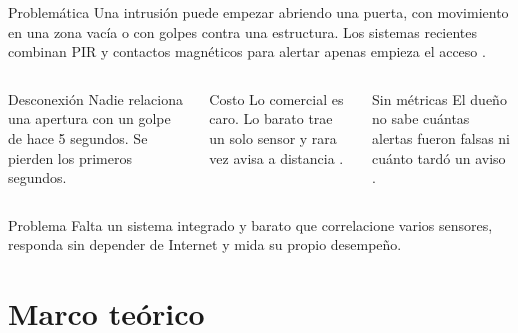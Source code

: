 \documentclass[aspectratio=169,10pt]{beamer}
\begin{document}
\begin{frame}{Problemática}
  Una intrusión puede empezar abriendo una puerta, con movimiento en una zona vacía o con golpes contra una estructura. Los sistemas recientes combinan PIR y contactos magnéticos para alertar apenas empieza el acceso \cite{arinde2024multisensor}.
  \vspace{3mm}
  \begin{columns}[T]
    \begin{block}{Desconexión}
      Nadie relaciona una apertura con un golpe de hace 5 segundos. Se pierden los primeros segundos.
    \end{block}
    \begin{block}{Costo}
      Lo comercial es caro. Lo barato trae un solo sensor y rara vez avisa a distancia \cite{oktafiani2025esp32}.
    \end{block}
    \begin{block}{Sin métricas}
      El dueño no sabe cuántas alertas fueron falsas ni cuánto tardó un aviso \cite{pugh2015fusion}.
    \end{block}
  \end{columns}
  \vspace{3mm}
  \begin{alertblock}{Problema}
    Falta un sistema integrado y barato que correlacione varios sensores, responda sin depender de Internet y mida su propio desempeño.
  \end{alertblock}
\end{frame}

\section{Marco teórico}
\end{document}
